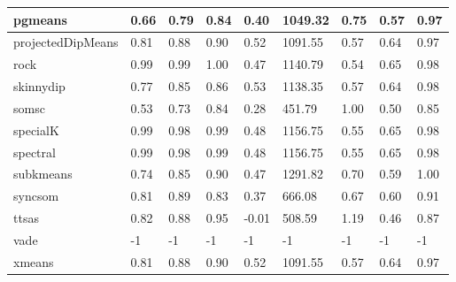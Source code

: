 \begin{table}[H]
\begin{tabular}{|l|l|l|l|l|l|l|l|l|}
\hline
pgmeans & 0.66 & 0.79 & 0.84 & 0.40 & 1049.32 & 0.75 & 0.57 & 0.97 \\
\hline
projectedDipMeans & 0.81 & 0.88 & 0.90 & 0.52 & 1091.55 & 0.57 & 0.64 & 0.97 \\
\hline
rock & 0.99 & 0.99 & 1.00 & 0.47 & 1140.79 & 0.54 & 0.65 & 0.98 \\
\hline
skinnydip & 0.77 & 0.85 & 0.86 & 0.53 & 1138.35 & 0.57 & 0.64 & 0.98 \\
\hline
somsc & 0.53 & 0.73 & 0.84 & 0.28 & 451.79 & 1.00 & 0.50 & 0.85 \\
\hline
specialK & 0.99 & 0.98 & 0.99 & 0.48 & 1156.75 & 0.55 & 0.65 & 0.98 \\
\hline
spectral & 0.99 & 0.98 & 0.99 & 0.48 & 1156.75 & 0.55 & 0.65 & 0.98 \\
\hline
subkmeans & 0.74 & 0.85 & 0.90 & 0.47 & 1291.82 & 0.70 & 0.59 & 1.00 \\
\hline
syncsom & 0.81 & 0.89 & 0.83 & 0.37 & 666.08 & 0.67 & 0.60 & 0.91 \\
\hline
ttsas & 0.82 & 0.88 & 0.95 & -0.01 & 508.59 & 1.19 & 0.46 & 0.87 \\
\hline
vade & -1 & -1 & -1 & -1 & -1 & -1 & -1 & -1 \\
\hline
xmeans & 0.81 & 0.88 & 0.90 & 0.52 & 1091.55 & 0.57 & 0.64 & 0.97 \\
\hline
\end{tabular}
\end{table}



